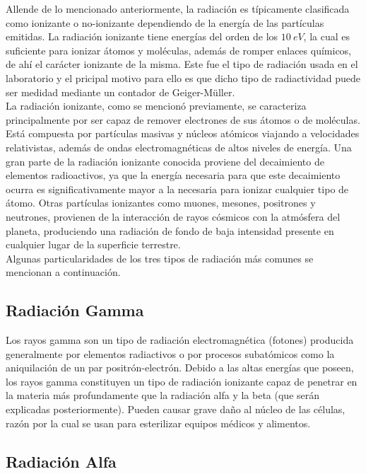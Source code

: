 \documentclass[prb,aps,twocolumn,preprintnumbers,amsmath,amssymb]{revtex4}
\begin{document}
Allende de lo mencionado anteriormente, la radiación es típicamente clasificada como ionizante o no-ionizante dependiendo de la energía de las partículas emitidas. La radiación ionizante tiene energías del orden de los $10\ eV$, la cual es suficiente para ionizar átomos y moléculas, además de romper enlaces químicos, de ahí el carácter ionizante de la misma. Este fue el tipo de radiación usada en el laboratorio y el pricipal motivo para ello es que dicho tipo de radiactividad puede ser medidad mediante un contador de Geiger-Müller.\\

La radiación ionizante, como se mencionó previamente, se caracteriza principalmente por ser capaz de remover electrones de sus átomos o de moléculas. Está compuesta por partículas masivas y núcleos atómicos viajando a velocidades relativistas, además de ondas electromagnéticas de altos niveles de energía. Una gran parte de la radiación ionizante conocida proviene del decaimiento de elementos radioactivos, ya que la energía necesaria para que este decaimiento ocurra es significativamente mayor a la necesaria para ionizar cualquier tipo de átomo. Otras partículas ionizantes como muones, mesones, positrones y neutrones, provienen de la interacción de rayos cósmicos con la atmósfera del planeta, produciendo una radiación de fondo de baja intensidad presente en cualquier lugar de la superficie terrestre.\\

Algunas particularidades de los tres tipos de radiación más comunes se mencionan a continuación. 

\subsection{Radiación Gamma}
Los rayos gamma son un tipo de radiación electromagnética (fotones) producida generalmente por elementos radiactivos o por procesos subatómicos como la aniquilación de un par positrón-electrón. Debido a las altas energías que poseen, los rayos gamma constituyen un tipo de radiación ionizante capaz de penetrar en la materia más profundamente que la radiación alfa y la beta (que serán explicadas posteriormente). Pueden causar grave daño al núcleo de las células, razón por la cual se usan para esterilizar equipos médicos y alimentos\cite{hyperphyisics}. 


\subsection{Radiación Alfa}
\end{document}
